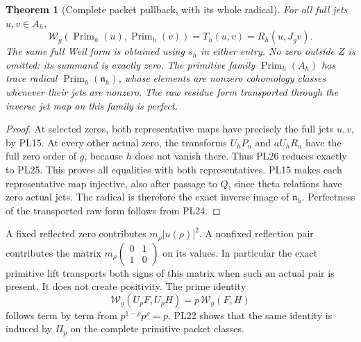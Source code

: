 \documentclass[11pt,a4paper]{article}
\newtheorem{theorem}{Theorem}[section]
\theoremstyle{definition}\newtheorem{definition}[theorem]{Definition}
\begin{document}
\begin{theorem}[Complete packet pullback, with its whole radical]
\label{pl:thm:pairing}
For all full jets \(u,v\in A_h\),
\[
 \mathcal W_g(\operatorname{Prim}_h(u),\operatorname{Prim}_h(v))
 =T_h(u,v)=R_h(u,J_gv).
 \tag{PL27}\label{pl:pl:pullback}
\]
The same full Weil form is obtained using \(s_h\) in either entry.
No zero outside \(Z\) is omitted: its summand is exactly zero.
The primitive family \(\operatorname{Prim}_h(A_h)\) has trace
radical \(\operatorname{Prim}_h(\mathfrak n_h)\), whose elements
are nonzero cohomology classes whenever their jets are nonzero.
The raw residue form transported through the inverse jet map on
this family is perfect.
\end{theorem}
\begin{proof}
At selected zeros, both representative maps have precisely the full
jets \(u,v\), by PL15. At every other actual zero, the transforms
\(U_hP_u\) and \(aU_hR_u\) have the full zero order of \(g\), because
\(h\) does not vanish there. Thus PL26 reduces exactly to PL25.
This proves all equalities with both representatives.
PL15 makes each representative map injective, also after passage to
\(Q\), since theta relations have zero actual jets. The radical is
therefore the exact inverse image of \(\mathfrak n_h\).
Perfectness of the transported raw form follows from PL24.
\end{proof}

A fixed reflected zero contributes \(m_\rho|u(\rho)|^2\).
A nonfixed reflection pair contributes the matrix
\(m_\rho\left(\begin{smallmatrix}0&1\\1&0\end{smallmatrix}\right)\)
on its values. In particular the exact primitive lift transports
both signs of this matrix when such an actual pair is present.
It does not create positivity. The prime identity
\[
 \mathcal W_g(U_pF,U_pH)=p\,\mathcal W_g(F,H)
 \tag{PL28}
\]
follows term by term from
\(\overline{p^{1-\bar\rho}}p^\rho=p\).
PL22 shows that the same identity is induced by \(\Pi_p\) on
the complete primitive packet classes.
\end{document}
